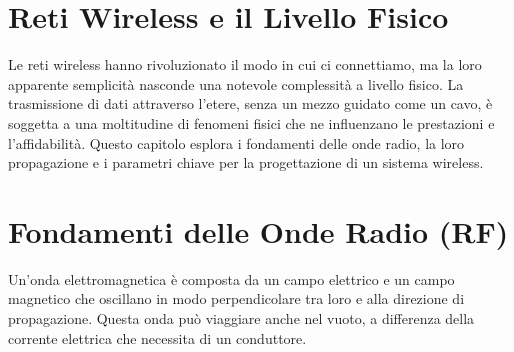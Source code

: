 \section{Reti Wireless e il Livello Fisico}
Le reti wireless hanno rivoluzionato il modo in cui ci connettiamo, ma la loro apparente semplicità nasconde una notevole complessità a livello fisico. La trasmissione di dati attraverso l'etere, senza un mezzo guidato come un cavo, è soggetta a una moltitudine di fenomeni fisici che ne influenzano le prestazioni e l'affidabilità. Questo capitolo esplora i fondamenti delle onde radio, la loro propagazione e i parametri chiave per la progettazione di un sistema wireless.

\section{Fondamenti delle Onde Radio (RF)}


Un'onda elettromagnetica è composta da un campo elettrico e un campo magnetico che oscillano in modo perpendicolare tra loro e alla direzione di propagazione. Questa onda può viaggiare anche nel vuoto, a differenza della corrente elettrica che necessita di un conduttore.

